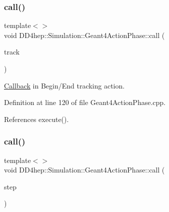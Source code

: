 \hypertarget{class_d_d4hep_1_1_simulation_1_1_geant4_action_phase_a4b22414e6a0bc6e8953cd26148ec9bfd}{}\label{class_d_d4hep_1_1_simulation_1_1_geant4_action_phase_a4b22414e6a0bc6e8953cd26148ec9bfd} 
\subsubsection{\texorpdfstring{call()}{call()}\hspace{0.1cm}{\footnotesize\ttfamily [4/12]}}
{\footnotesize\ttfamily template$<$$>$ \\
void D\+D4hep\+::\+Simulation\+::\+Geant4\+Action\+Phase\+::call (\begin{DoxyParamCaption}\item[{const G4\+Track $\ast$}]{track }\end{DoxyParamCaption})}



\hyperlink{class_d_d4hep_1_1_callback}{Callback} in Begin/\+End tracking action. 



Definition at line 120 of file Geant4\+Action\+Phase.\+cpp.



References execute().

\hypertarget{class_d_d4hep_1_1_simulation_1_1_geant4_action_phase_a3145119cef0e2e9ce31fc747d82a781b}{}\label{class_d_d4hep_1_1_simulation_1_1_geant4_action_phase_a3145119cef0e2e9ce31fc747d82a781b} 
\subsubsection{\texorpdfstring{call()}{call()}\hspace{0.1cm}{\footnotesize\ttfamily [5/12]}}
{\footnotesize\ttfamily template$<$$>$ \\
void D\+D4hep\+::\+Simulation\+::\+Geant4\+Action\+Phase\+::call (\begin{DoxyParamCaption}\item[{const G4\+Step $\ast$}]{step }\end{DoxyParamCaption})}



